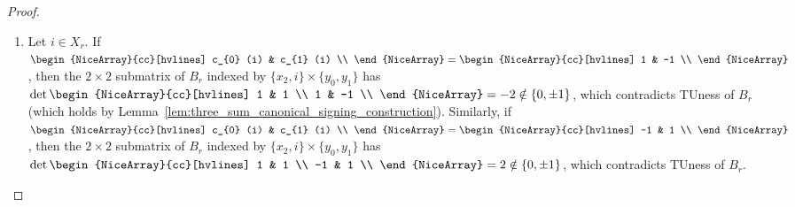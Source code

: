 \begin{proof}
    \begin{enumerate}
        \item Let $i \in X_{r}$. If $\begin{NiceArray}{cc}[hvlines] c_{0} (i) & c_{1} (i) \\ \end{NiceArray} = \begin{NiceArray}{cc}[hvlines] 1 & -1 \\ \end{NiceArray}$, then the $2 \times 2$ submatrix of $B_{r}$ indexed by $\{x_{2}, i\} \times \{y_{0}, y_{1}\}$ has $\det \begin{NiceArray}{cc}[hvlines] 1 & 1 \\ 1 & -1 \\ \end{NiceArray} = -2 \notin \{0, \pm 1\}$, which contradicts TUness of $B_{r}$ (which holds by Lemma~\ref{lem:three_sum_canonical_signing_construction}). Similarly, if $\begin{NiceArray}{cc}[hvlines] c_{0} (i) & c_{1} (i) \\ \end{NiceArray} = \begin{NiceArray}{cc}[hvlines] -1 & 1 \\ \end{NiceArray} $, then the $2 \times 2$ submatrix of $B_{r}$ indexed by $\{x_{2}, i\} \times \{y_{0}, y_{1}\}$ has $\det \begin{NiceArray}{cc}[hvlines] 1 & 1 \\ -1 & 1 \\ \end{NiceArray} = 2 \notin \{0, \pm 1\}$, which contradicts TUness of $B_{r}$.



\end{enumerate}
\end{proof}
